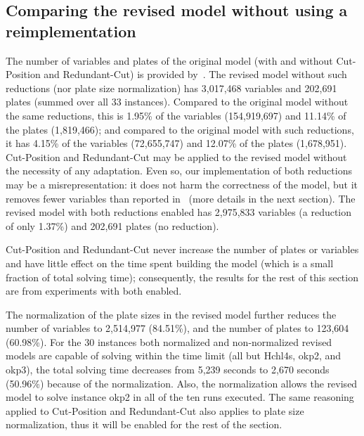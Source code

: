 \documentclass[smallextended]{svjour3}       %
\begin{document}
\subsection{Comparing the revised model without using a reimplementation}

The number of variables and plates of the original model (with and without Cut-Position and Redundant-Cut) is provided by~\cite{dimitri_thesis}.
The revised model without such reductions (nor plate size normalization) has 3,017,468 variables and 202,691 plates (summed over all 33 instances). Compared to the original model without the same reductions, this is 1.95\% of the variables (154,919,697) and 11.14\% of the plates (1,819,466); and compared to the original model with such reductions, it has 4.15\% of the variables (72,655,747) and 12.07\% of the plates (1,678,951).
Cut-Position and Redundant-Cut may be applied to the revised model without the necessity of any adaptation.
Even so, our implementation of both reductions may be a misrepresentation: it does not harm the correctness of the model, but it removes fewer variables than reported in~\cite{dimitri_thesis} (more details in the next section).
The revised model with both reductions enabled has 2,975,833 variables (a reduction of only 1.37\%) and 202,691 plates (no reduction). 

Cut-Position and Redundant-Cut never increase the number of plates or variables and have little effect on the time spent building the model (which is a small fraction of total solving time); consequently, the results for the rest of this section are from experiments with both enabled.

The normalization of the plate sizes in the revised model further reduces the number of variables to 2,514,977 (84.51\%), and the number of plates to 123,604 (60.98\%).
For the 30 instances both normalized and non-normalized revised models are capable of solving within the time limit (all but Hchl4s, okp2, and okp3), the total solving time decreases from 5,239 seconds to 2,670 seconds (50.96\%) because of the normalization.
Also, the normalization allows the revised model to solve instance okp2 in all of the ten runs executed.
The same reasoning applied to Cut-Position and Redundant-Cut also applies to plate size normalization, thus it will be enabled for the rest of the section.
\end{document}

